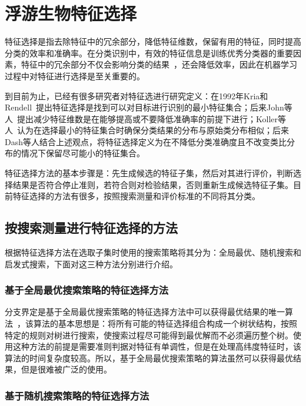 \section{浮游生物特征选择}
\label{sec:featureselection}

特征选择是指去除特征中的冗余部分，降低特征维数，保留有用的特征，同时提高分类的效率和准确率。在分类识别中，有效的特征信息是训练优秀分类器的重要因素，特征中的冗余部分不仅会影响分类的结果~\cite{姚旭2012特征选择方法综述}，还会降低效率，因此在机器学习过程中对特征进行选择是至关重要的。

到目前为止，已经有很多研究者对特征选进行研究定义：在1992年Kria和Rendell~\cite{Kira1992The}提出特征选择是找到可以对目标进行识别的最小特征集合；后来John等人~\cite{John1998Irrelevant}提出减少特征维数是在能够提高或不要降低准确率的前提下进行；Koller等人~\cite{Koller2000Toward}认为在选择最小的特征集合时确保分类结果的分布与原始类分布相似；后来Dash等人\cite{Dash1997Feature}结合上述观点，将特征选择定义为在不降低分类准确度且不改变类比分布的情况下保留尽可能小的特征集合。

特征选择方法的基本步骤是：先生成候选的特征子集，然后对其进行评价，判断选择结果是否符合停止准则，若符合则对检验结果，否则重新生成候选特征子集。目前特征选择的方法有很多，按照搜索测量和评价标准的不同将其分类。

\subsection{按搜索测量进行特征选择的方法}

根据特征选择方法在选取子集时使用的搜索策略将其分为：全局最优、随机搜索和启发式搜索，下面对这三种方法分别进行介绍。

\subsubsection{基于全局最优搜索策略的特征选择方法}

分支界定是基于全局最优搜索策略的特征选择方法中可以获得最优结果的唯一算法~\cite{姚旭2012特征选择方法综述}，该算法的基本思想是：将所有可能的特征选择组合构成一个树状结构，按照特定的规则对树进行搜索，使搜索过程尽可能得到最优解而不必须遍历整个树。使用这种方法的前提是需要准则判据对特征有单调性，但是在处理高纬度特征时，该算法的时间复杂度较高。所以，基于全局最优搜索策略的算法虽然可以获得最优结果，但是很难被广泛的使用。

\subsubsection{基于随机搜索策略的特征选择方法}

